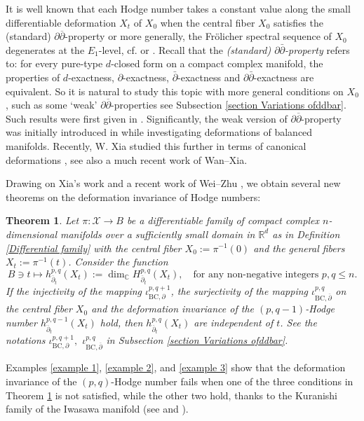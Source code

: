 \documentclass[12pt]{amsart}
\numberwithin{equation}{section}
\theoremstyle{definition}
\theoremstyle{definition}
\theoremstyle{definition}
\renewcommand{\1}{\mathsf{1}}
\newcommand{\db}{\overline{\partial}}
\renewcommand{\>}{\rightarrow}
\newcommand{\p}{\partial}
\newcommand{\bp}{\overline\partial}
\def\p{\partial}
\def\b{\bar}
\theoremstyle{plain} %
\newtheorem{bigthm}{Theorem}
\theoremstyle{plain} %
\theoremstyle{plain} %
\begin{document}
It is well known that each Hodge number
	takes a constant value along the small differentiable deformation $X_t$ of $X_0$ when the central fiber $X_0$ satisfies the (standard) $\p\bp$-property
	or more generally, the Fr\"{o}licher spectral sequence of $X_0$ degenerates at the $E_1$-level, cf. \cite[Section
	5.1]{Gs} or \cite[Proposition 9.20]{Vo02}. Recall that the \textit{(standard)  {$\p\b{\p}$-property}} refers
	to: for every pure-type $d$-closed form on a compact complex manifold, the properties of
	$d$-exactness, $\p$-exactness, $\b{\p}$-exactness and
	$\p\b{\p}$-exactness are equivalent. So it is natural to study this topic with more general conditions on $X_0$, such as some `weak' $\p\bp$-properties  see Subsection \ref{section Variations ofddbar}.  Such results were first given in \cite{ZR15,RZ18}. Significantly,  the weak version of $\p\bp$-property was initially introduced in \cite{FY11} while investigating deformations of balanced manifolds. Recently, W. Xia studied this further in terms of canonical deformations \cite[Theorem 1.3]{Xi21b}, see also a much recent work \cite{WX23} of Wan--Xia.  
    
    Drawing on  Xia's work and a  recent work of Wei--Zhu \cite{WZ20}, we obtain several new  theorems on the deformation invariance of Hodge numbers:
	
	\begin{bigthm}\label{pq def}
		Let $\pi:\mathcal{X} \rightarrow
		B$  be	a differentiable family of compact complex $n$-dimensional manifolds
		over a sufficiently small domain in $\mathbb{R}^d$  as in Definition \ref{Differential family} with the
		central  fiber $X_0:= \pi^{-1}(0)$ and the general fibers $X_t:=\pi^{-1}(t)$.
		Consider the  function
		\begin{equation}\label{hodge number equation}
			B \ni t\longmapsto h^{p,q}_{\db_t}(X_t):=\dim_{\mathbb{C}}H^{p,q}_{\db_t}(X_t),\quad \text{for any non-negative integers $p,q\leq n$}.
		\end{equation}
		If the injectivity of the mapping $\iota_{\mathrm {BC},\p}^{p,q+1}$, the surjectivity of the mapping $\iota_{\mathrm {BC},\bp}^{p,q}$ on the central fiber
		$X_0$ and the deformation invariance of the $(p,q-1)$-Hodge number $h^{p,q-1}_{\db_t}(X_t)$ hold,
		then $h^{p,q}_{\db_t}(X_t)$ are independent of $t$. See the  notations $\iota_{\mathrm {BC},\p}^{p,q+1},$ $\iota_{\mathrm {BC},\bp}^{p,q}$ in Subsection \ref{section Variations ofddbar}.
\end{bigthm}
	
	Examples \ref{example 1}, \ref{example 2}, and \ref{example 3} show  that the deformation invariance of the $(p,q)$-Hodge number fails when one of the three conditions in Theorem \ref{pq def} is not satisfied, while the other two hold, thanks to the  Kuranishi family of the Iwasawa manifold (see \cite[Appendix]{Ag13} and \cite[Section 1.c]{Sc07}).
	
\end{document}
